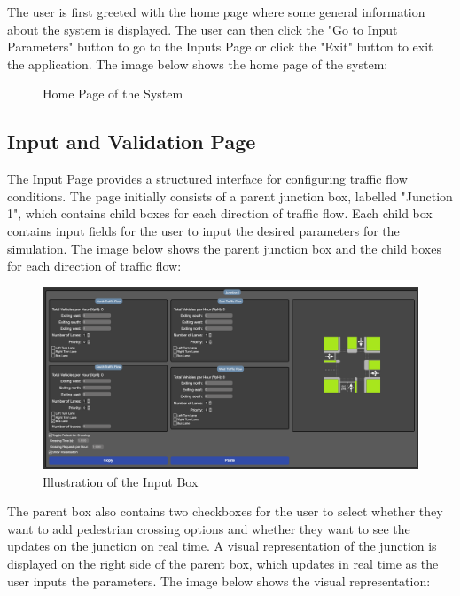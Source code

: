 \documentclass{article}
\begin{document}
        The user is first greeted with the home page where some general information about the system is displayed. The user can then click the "Go to Input Parameters" button to go to the Inputs Page 
        or click the "Exit" button to exit the application. The image below shows the home page of the system:

        \begin{figure}[H]
            \centering
            \caption{Home Page of the System}
            \label{fig:homepage}
        \end{figure}
    
    \subsection{Input and Validation Page}

        The Input Page provides a structured interface for configuring traffic flow conditions. The page initially consists of a parent junction box, labelled "Junction 1", which contains child boxes for 
        each direction of traffic flow. Each child box contains input fields for the user to input the desired parameters for the simulation. The image below shows the parent junction box and the child boxes for
        each direction of traffic flow:
        
        \begin{figure}[h!]
            \centering
            \includegraphics[width=\textwidth]{inputExtra.png}
            \caption{Illustration of the Input Box}
            \label{fig:inputBox}
        \end{figure}

        The parent box also contains two checkboxes for the user to select whether they want to add pedestrian crossing options and whether they want to see the updates on the junction on real time. A visual representation of the
        junction is displayed on the right side of the parent box, which updates in real time as the user inputs the parameters. The image below shows the visual representation:
\end{document}
